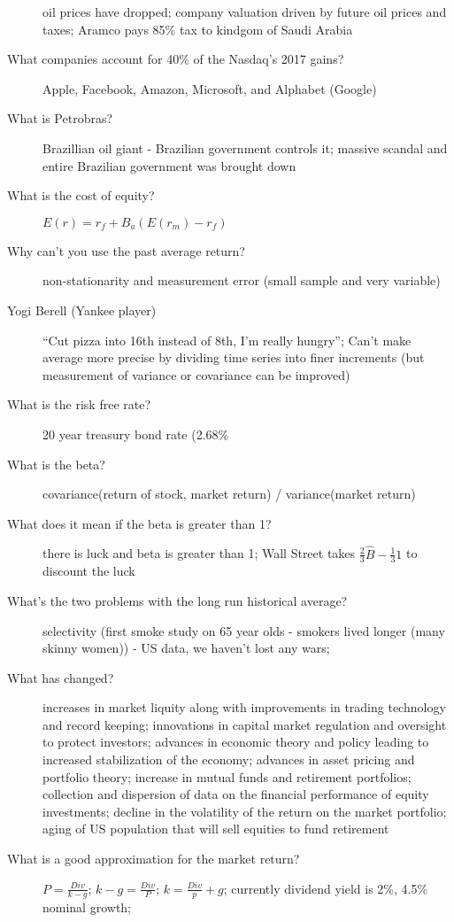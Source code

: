 \documentclass[11pt]{article}
\begin{document}
\begin{description}
  oil prices have dropped;
  company valuation driven by future oil prices and taxes;
  Aramco pays 85\% tax to kindgom of Saudi Arabia
\item[What companies account for 40\% of the Nasdaq's 2017 gains?]
  Apple, Facebook, Amazon, Microsoft, and Alphabet (Google)
\item[What is Petrobras?]
  Brazillian oil giant - Brazilian government controls it;
  massive scandal and entire Brazilian government was brought down
\item[What is the cost of equity?]
  $E(r) = r_f + B_a(E(r_m) - r_f)$
\item[Why can't you use the past average return?]
  non-stationarity and measurement error (small sample and very variable)
\item[Yogi Berell (Yankee player)]
  ``Cut pizza into 16th instead of 8th, I'm really hungry'';
  Can't make average more precise by dividing time series into finer increments (but measurement of variance or covariance can be improved)
\item[What is the risk free rate?]
  20 year treasury bond rate (2.68\%
\item[What is the beta?]
  covariance(return of stock, market return) / variance(market return)
\item[What does it mean if the beta is greater than 1?]
  there is luck and beta is greater than 1;
  Wall Street takes $\frac{2}{3} \hat B - \frac{1}{3} 1$ to discount the luck
\item[What's the two problems with the long run historical average?]
  selectivity (first smoke study on 65 year olds - smokers lived longer (many skinny women)) - US data, we haven't lost any wars;
\item[What has changed?]
  increases in market liquity along with improvements in trading technology and record keeping;
  innovations in capital market regulation and oversight to protect investors;
  advances in economic theory and policy leading to increased stabilization of the economy;
  advances in asset pricing and portfolio theory;
  increase in mutual funds and retirement portfolios;
  collection and dispersion of data on the financial performance of equity investments;
  decline in the volatility of the return on the market portfolio;
  aging of US population that will sell equities to fund retirement
\item[What is a good approximation for the market return?]
  $P = \frac{Div}{k -g}$;
  $k - g = \frac{Div}{P}$;
  $k = \frac{Div}{p} + g$;
  currently dividend yield is 2\%, 4.5\% nominal growth;

\end{description}
\end{document}
